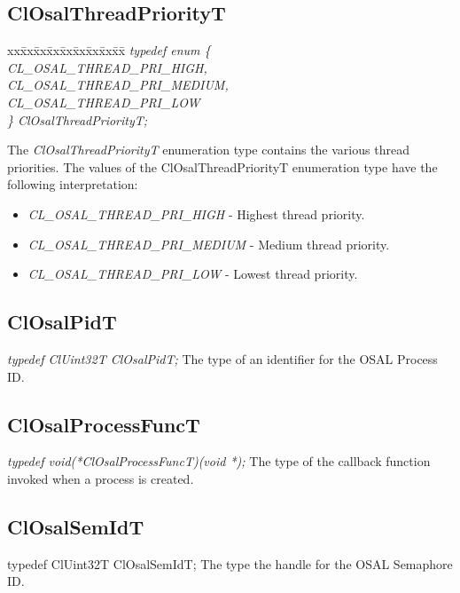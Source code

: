 \subsection{ClOsalThreadPriorityT}
\begin{tabbing}
xx\=xx\=xx\=xx\=xx\=xx\=xx\=xx\=xx\=\kill
\textit{typedef enum \{}\\
\>\>\>\>\textit{CL\_OSAL\_THREAD\_PRI\_HIGH,}\\
\>\>\>\>\textit{CL\_OSAL\_THREAD\_PRI\_MEDIUM,}\\
\>\>\>\>\textit{CL\_OSAL\_THREAD\_PRI\_LOW}\\
\textit{\} ClOsalThreadPriorityT;}\end{tabbing}
The \textit{ClOsalThreadPriorityT} enumeration type contains the various thread priorities. The values of the ClOsalThreadPriorityT 
enumeration type have the following interpretation:
\begin{itemize}
\item
\textit{CL\_\-OSAL\_\-THREAD\_\-PRI\_\-HIGH} - Highest thread priority.
\item
\textit{CL\_\-OSAL\_\-THREAD\_\-PRI\_\-MEDIUM} - Medium thread priority.
\item
\textit{CL\_\-OSAL\_\-THREAD\_\-PRI\_\-LOW} - Lowest thread priority.
\end{itemize}



\subsection{ClOsalPidT}
\textit{typedef ClUint32T ClOsalPidT;}
\newline
\newline
The type of an identifier for the OSAL Process ID.


\subsection{ClOsalProcessFuncT}
\textit{typedef void(*ClOsalProcessFuncT)(void *);}
\newline
\newline
The type of the callback function invoked when a process is created.

\subsection{ClOsalSemIdT}
typedef ClUint32T ClOsalSemIdT;
\newline
\newline
The type the handle for the OSAL Semaphore ID.


